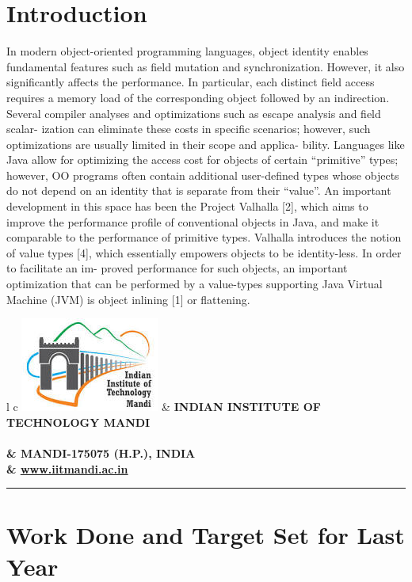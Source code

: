 \documentclass[12 pt, a4paper]{article}
\newcommand{\HRule}{\rule{\linewidth}{1mm}}
\begin{document}
\section{Introduction}

In modern object-oriented programming languages, object identity
enables fundamental features such as field mutation and synchronization. However, it also significantly affects the performance. In
particular, each distinct field access requires a memory load of the
corresponding object followed by an indirection. Several compiler
analyses and optimizations such as escape analysis and field scalar-
ization can eliminate these costs in specific scenarios; however,
such optimizations are usually limited in their scope and applica-
bility. Languages like Java allow for optimizing the access cost for
objects of certain “primitive” types; however, OO programs often
contain additional user-defined types whose objects do not depend
on an identity that is separate from their “value”. An important
development in this space has been the Project Valhalla [2], which
aims to improve the performance profile of conventional objects in
Java, and make it comparable to the performance of primitive types.
Valhalla introduces the notion of value types [4], which essentially
empowers objects to be identity-less. In order to facilitate an im-
proved performance for such objects, an important optimization
that can be performed by a value-types supporting Java Virtual
Machine (JVM) is object inlining [1] or flattening.
\clearpage
{}
\pagestyle{empty}
\vskip 0.2cm
\begin{tabular}{l c}
	{\includegraphics[scale=0.50]{logo.jpg}}                              &
	\large\bf{INDIAN INSTITUTE OF TECHNOLOGY MANDI} \\
	\\ & \large\bf{MANDI-175075 (H.P.), INDIA} \\ & \underline{\href{www.iitmandi.ac.in}{www.iitmandi.ac.in}}
\end{tabular}
\vskip 0.7cm
{\raggedleft{}\HRule}

\section{Work Done and Target Set for Last Year}
\end{document}
